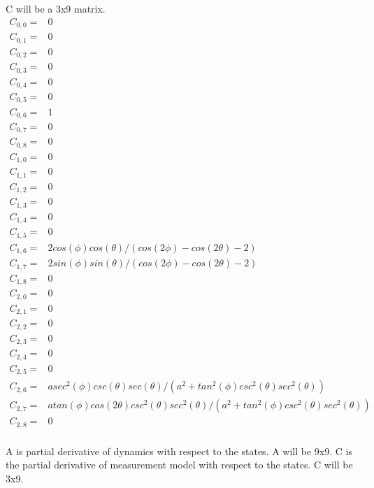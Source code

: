 \documentclass[conference]{IEEEtran}
\begin{document}
C will be a 3x9 matrix.
\begin{align*}
C_{0,0} =& 0\\
C_{0,1} =& 0\\
C_{0,2} =& 0\\
C_{0,3} =& 0 \\
C_{0,4} =& 0 \\
C_{0,5} =& 0 \\
C_{0,6} =& 1 \\
C_{0,7} =& 0 \\
C_{0,8} =& 0\\
C_{1,0} =& 0\\
C_{1,1} =& 0\\
C_{1,2} =& 0\\
C_{1,3} =& 0 \\
C_{1,4} =& 0 \\
C_{1,5} =& 0 \\
C_{1,6} =& 2 cos(\phi) cos(\theta) / (cos(2 \phi) - cos (2 \theta) - 2) \\
C_{1,7} =& 2 sin(\phi) sin(\theta) / (cos(2\phi) - cos(2 \theta) -2) \\
C_{1,8} =& 0\\
C_{2,0} =& 0\\
C_{2,1} =& 0\\
C_{2,2} =& 0\\
C_{2,3} =& 0 \\
C_{2,4} =& 0 \\
C_{2,5} =& 0 \\
C_{2,6} =& a sec^2(\phi) csc(\theta) sec(\theta) / (a^2 + tan^2(\phi) csc^2 (\theta) sec^2 (\theta))\\
C_{2,7} =& a tan(\phi) cos(2 \theta) csc^2 (\theta) sec^2 (\theta) / (a^2 + tan^2 (\phi) csc^2(\theta) sec^2(\theta)) \\
C_{2,8} =& 0\\
\end{align*}


A is partial derivative of dynamics with respect to the states. A will be 9x9. C is the partial derivative of measurement model with respect to the states. C will be 3x9.
\end{document}
